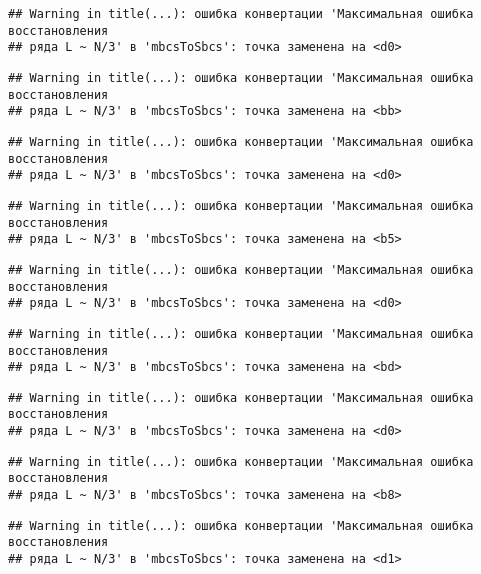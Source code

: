 \documentclass[
]{article}
\begin{document}
\begin{verbatim}
## Warning in title(...): ошибка конвертации 'Максимальная ошибка восстановления
## ряда L ~ N/3' в 'mbcsToSbcs': точка заменена на <d0>
\end{verbatim}

\begin{verbatim}
## Warning in title(...): ошибка конвертации 'Максимальная ошибка восстановления
## ряда L ~ N/3' в 'mbcsToSbcs': точка заменена на <bb>
\end{verbatim}

\begin{verbatim}
## Warning in title(...): ошибка конвертации 'Максимальная ошибка восстановления
## ряда L ~ N/3' в 'mbcsToSbcs': точка заменена на <d0>
\end{verbatim}

\begin{verbatim}
## Warning in title(...): ошибка конвертации 'Максимальная ошибка восстановления
## ряда L ~ N/3' в 'mbcsToSbcs': точка заменена на <b5>
\end{verbatim}

\begin{verbatim}
## Warning in title(...): ошибка конвертации 'Максимальная ошибка восстановления
## ряда L ~ N/3' в 'mbcsToSbcs': точка заменена на <d0>
\end{verbatim}

\begin{verbatim}
## Warning in title(...): ошибка конвертации 'Максимальная ошибка восстановления
## ряда L ~ N/3' в 'mbcsToSbcs': точка заменена на <bd>
\end{verbatim}

\begin{verbatim}
## Warning in title(...): ошибка конвертации 'Максимальная ошибка восстановления
## ряда L ~ N/3' в 'mbcsToSbcs': точка заменена на <d0>
\end{verbatim}

\begin{verbatim}
## Warning in title(...): ошибка конвертации 'Максимальная ошибка восстановления
## ряда L ~ N/3' в 'mbcsToSbcs': точка заменена на <b8>
\end{verbatim}

\begin{verbatim}
## Warning in title(...): ошибка конвертации 'Максимальная ошибка восстановления
## ряда L ~ N/3' в 'mbcsToSbcs': точка заменена на <d1>
\end{verbatim}
\end{document}
